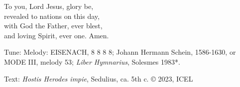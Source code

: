 \hymn



\begin{underhymnverse}
To you, Lord Jesus, glory be,\\
revealed to nations on this day,\\
with God the Father, ever blest,\\
and loving Spirit, ever one. Amen.
\end{underhymnverse}

\begin{hymnsource}
Tune: Melody: EISENACH, 8 8 8 8; Johann Hermann Schein, 1586-1630, or MODE III, melody 53; \emph{Liber Hymnarius}, Solesmes 1983*.

Text: \emph{Hostis Herodes impie}, Sedulius, ca. 5th c. © 2023, ICEL
\end{hymnsource}
